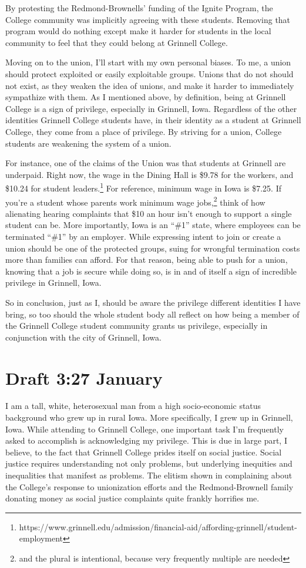 \documentclass[12pt]{article}[titlepage]
\newcommand{\say}[1]{``\#1''}
\newcommand{\1}{\={a}}
\newcommand{\2}{\={e}}
\newcommand{\3}{\={\i}}
\newcommand{\4}{\=o}
\newcommand{\5}{\=u}
\newcommand{\6}{\={A}}
\renewcommand{\,}{\textsuperscript{,}}
\begin{document}
By protesting the Redmond-Brownells' funding of the Ignite Program, the College community was implicitly agreeing with these students.
Removing that program would do nothing except make it harder for students in the local community to feel that they could belong at Grinnell College.

Moving on to the union, I'll start with my own personal biases.
To me, a union should protect exploited or easily exploitable groups.
Unions that do not should not exist, as they weaken the idea of unions, and make it harder to immediately sympathize with them.
As I mentioned above, by definition, being at Grinnell College is a sign of privilege, especially in Grinnell, Iowa.
Regardless of the other identities Grinnell College students have, in their identity as a student at Grinnell College, they come from a place of privilege.
By striving for a union, College students are weakening the system of a union.

For instance, one of the claims of the Union was that students at Grinnell are underpaid.
Right now, the wage in the Dining Hall is \$9.78 for the workers, and \$10.24 for student leaders.\footnote{https://www.grinnell.edu/admission/financial-aid/affording-grinnell/student-employment}
For reference, minimum wage in Iowa is \$7.25.
If you're a student whose parents work minimum wage jobs,\footnote{and the plural is intentional, because very frequently multiple are needed} think of how alienating hearing complaints that \$10 an hour isn't enough to support a single student can be.
More importantly, Iowa is an \say{at-will} state, where employees can be terminated \say{at will} by an employer.
While expressing intent to join or create a union should be one of the protected groups, suing for wrongful termination costs more than families can afford.
For that reason, being able to push for a union, knowing that a job is secure while doing so, is in and of itself a sign of incredible privilege in Grinnell, Iowa.

So in conclusion, just as I, should be aware the privilege different identities I have bring, so too should the whole student body all reflect on how being a member of the Grinnell College student community grants us privilege, especially in conjunction with the city of Grinnell, Iowa. 
\section{Draft 3:27 January}
I am a tall, white, heterosexual man from a high socio-economic status background who grew up in rural Iowa.
More specifically, I grew up in Grinnell, Iowa.
While attending to Grinnell College, one important task I'm frequently asked to accomplish is acknowledging my privilege.
This is due in large part, I believe, to the fact that Grinnell College prides itself on social justice.
Social justice requires understanding not only problems, but underlying inequities and inequalities that manifest as problems.
The elitism shown in complaining about the College's response to unionization efforts and the Redmond-Brownell family donating money as social justice complaints quite frankly horrifies me. 
\end{document}
